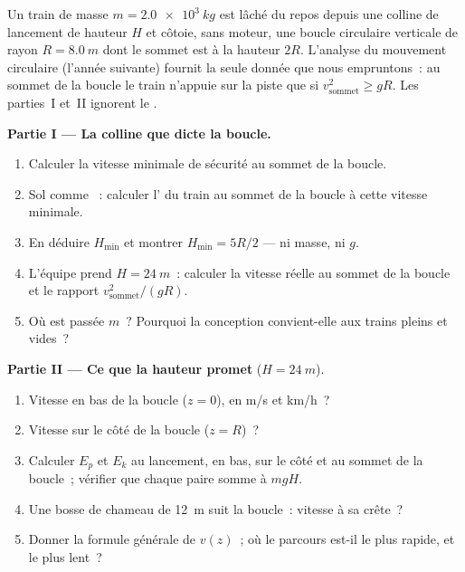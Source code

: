 \begin{problem}
\label{pb:g11:mechanical-energy:1}
Un train de masse $m = \qty{2.0e3}{kg}$ est lâché du repos depuis une
colline de lancement de hauteur $H$ et côtoie, sans moteur, une boucle
circulaire verticale de rayon $R = \qty{8.0}{m}$ dont le sommet est à
la hauteur $2R$. L'analyse du mouvement circulaire (l'année suivante)
fournit la seule donnée que nous empruntons~: au sommet de la boucle
le train n'appuie sur la piste que si
$v_{\text{sommet}}^2 \geq gR$. Les parties~I et~II ignorent le
.

\medskip
\noindent\textbf{Partie I --- La colline que dicte la boucle.}
\begin{enumerate}
  \item Calculer la vitesse minimale de sécurité au sommet de la
        boucle.
  \item Sol comme ~: calculer l'
         du train au
        sommet de la boucle à cette vitesse minimale.
  \item En déduire $H_{\min}$ et montrer $H_{\min} = 5R/2$ --- ni
        masse, ni $g$.
  \item L'équipe prend $H = \qty{24}{m}$~: calculer la vitesse réelle
        au sommet de la boucle et le rapport
        $v_{\text{sommet}}^2/(gR)$.
  \item Où est passée $m$~? Pourquoi la conception convient-elle aux
        trains pleins et vides~?
\end{enumerate}

\medskip
\noindent\textbf{Partie II --- Ce que la hauteur promet} ($H = \qty{24}{m}$).
\begin{enumerate}[resume]
  \item Vitesse en bas de la boucle ($z = 0$), en \unit{m/s} et
        \unit{km/h}~?
  \item Vitesse sur le côté de la boucle ($z = R$)~?
  \item Calculer $E_p$ et $E_k$ au lancement, en bas, sur le côté et
        au sommet de la boucle~; vérifier que chaque paire somme à
        $mgH$.
  \item Une bosse de chameau de \qty{12}{m} suit la boucle~: vitesse à
        sa crête~?
  \item Donner la formule générale de $v(z)$~; où le parcours est-il
        le plus rapide, et le plus lent~?
\end{enumerate}


\end{problem}
